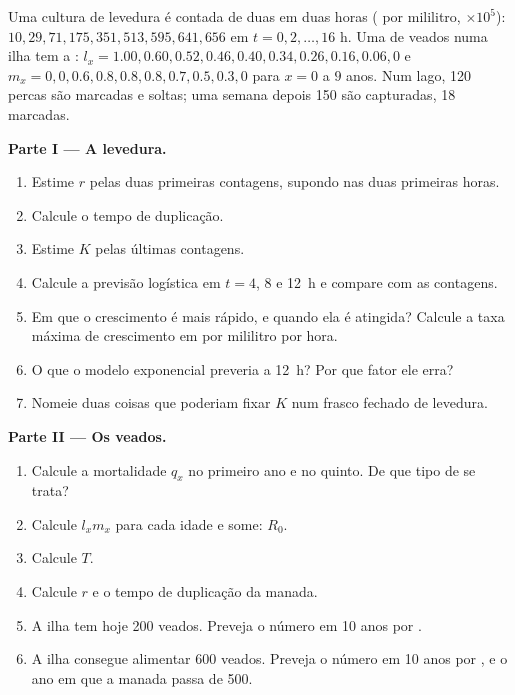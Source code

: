 \begin{problem}
\label{pb:b1:populations:1}
Uma cultura de levedura é contada de duas em duas horas ( por
mililitro, $\times 10^5$): $10, 29, 71, 175, 351, 513, 595, 641, 656$ em $t = 0,
2, \ldots, 16$ h. Uma  de veados numa ilha tem a : $l_x = 1.00, 0.60, 0.52, 0.46, 0.40, 0.34, 0.26, 0.16, 0.06, 0$ e
$m_x = 0, 0, 0.6, 0.8, 0.8, 0.8, 0.7, 0.5, 0.3, 0$ para $x = 0$ a $9$
anos. Num lago, 120 percas são marcadas e soltas; uma semana depois
150 são capturadas, 18 marcadas.

\medskip
\noindent\textbf{Parte I --- A levedura.}
\begin{enumerate}
  \item Estime $r$ pelas duas primeiras contagens, supondo  nas duas primeiras horas.
  \item Calcule o tempo de duplicação.
  \item Estime $K$ pelas últimas contagens.
  \item Calcule a previsão logística em $t = 4$, $8$ e \qty{12}{h} e
        compare com as contagens.
  \item Em que  o crescimento é mais rápido, e quando ela é
        atingida? Calcule a taxa máxima de crescimento em  por
        mililitro por hora.
  \item O que o modelo exponencial preveria a \qty{12}{h}? Por que
        fator ele erra?
  \item Nomeie duas coisas que poderiam fixar $K$ num frasco fechado
        de levedura.
\end{enumerate}

\medskip
\noindent\textbf{Parte II --- Os veados.}
\begin{enumerate}[resume]
  \item Calcule a mortalidade $q_x$ no primeiro ano e no quinto. De
        que tipo de  se trata?
  \item Calcule $l_x m_x$ para cada idade e some: $R_0$.
  \item Calcule $T$.
  \item Calcule $r$ e o tempo de duplicação da manada.
  \item A ilha tem hoje 200 veados. Preveja o número em 10 anos por
        .
  \item A ilha consegue alimentar 600 veados. Preveja o número em 10
        anos por , e o ano em que a manada passa
        de 500.
\end{enumerate}


\end{problem}
